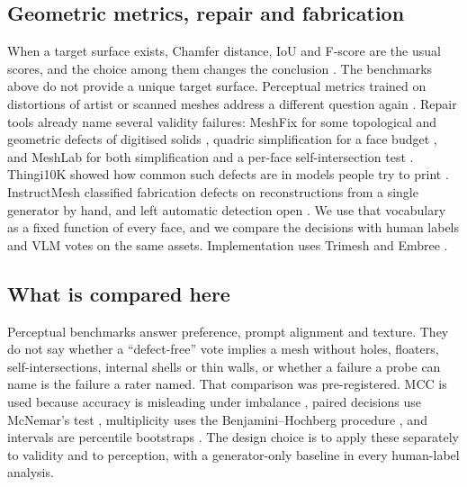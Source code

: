 \subsection{Geometric metrics, repair and fabrication}
When a target surface exists, Chamfer distance, IoU and F-score are the usual scores, and the choice among them changes the conclusion \citep{tatarchenko2019single}.
The benchmarks above do not provide a unique target surface.
Perceptual metrics trained on distortions of artist or scanned meshes address a different question again \citep{nehme2023tmqa}.
Repair tools already name several validity failures: MeshFix for some topological and geometric defects of digitised solids \citep{attene2010meshfix}, quadric simplification for a face budget \citep{garland1997qem}, and MeshLab for both simplification and a per-face self-intersection test \citep{cignoni2008meshlab}.
Thingi10K showed how common such defects are in models people try to print \citep{zhou2016thingi10k}.
InstructMesh classified fabrication defects on reconstructions from a single generator by hand, and left automatic detection open \citep{faruqi2026instructmesh}.
We use that vocabulary as a fixed function of every face, and we compare the decisions with human labels and VLM votes on the same assets.
Implementation uses Trimesh and Embree \citep{trimesh,wald2014embree}.

\subsection{What is compared here}
Perceptual benchmarks answer preference, prompt alignment and texture.
They do not say whether a ``defect-free'' vote implies a mesh without holes, floaters, self-intersections, internal shells or thin walls, or whether a failure a probe can name is the failure a rater named.
That comparison was pre-registered.
MCC is used because accuracy is misleading under imbalance \citep{chicco2020mcc}, paired decisions use McNemar's test \citep{mcnemar1947}, multiplicity uses the Benjamini--Hochberg procedure \citep{benjamini1995fdr}, and intervals are percentile bootstraps \citep{efron1993bootstrap}.
The design choice is to apply these separately to validity and to perception, with a generator-only baseline in every human-label analysis.
